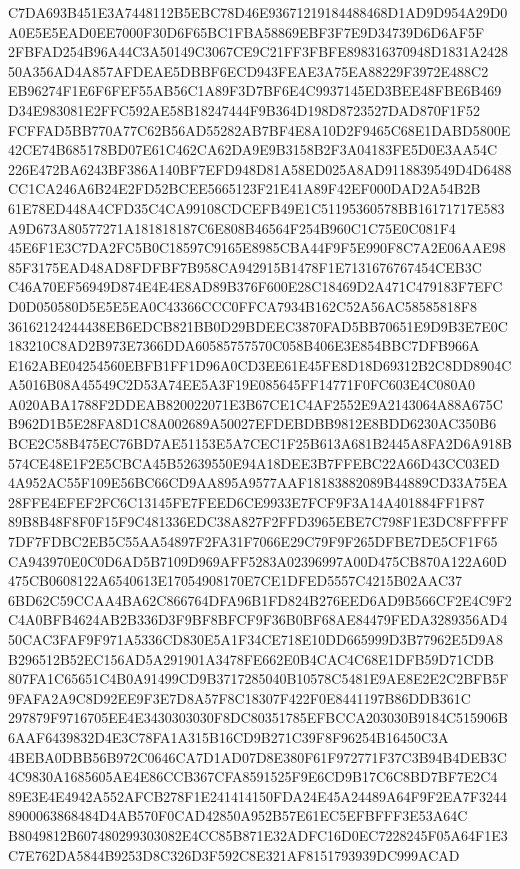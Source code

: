\documentclass[UTF8,fontset=fandol,zihao=-4,a4paper]{ctexart}
\begin{document}
{{C7DA693B451E3A7448112B5EBC78D46E93671219184488468D1AD9D954A29D0A0E5E5EAD0EE7000F30D6F65BC1FBA58869EBF3F7E9D34739D6D6AF5F
2FBFAD254B96A44C3A50149C3067CE9C21FF3FBFE898316370948D1831A242850A356AD4A857AFDEAE5DBBF6ECD943FEAE3A75EA88229F3972E488C2
EB96274F1E6F6FEF55AB56C1A89F3D7BF6E4C9937145ED3BEE48FBE6B469D34E983081E2FFC592AE58B18247444F9B364D198D8723527DAD870F1F52
FCFFAD5BB770A77C62B56AD55282AB7BF4E8A10D2F9465C68E1DABD5800E42CE74B685178BD07E61C462CA62DA9E9B3158B2F3A04183FE5D0E3AA54C
226E472BA6243BF386A140BF7EFD948D81A58ED025A8AD9118839549D4D6488CC1CA246A6B24E2FD52BCEE5665123F21E41A89F42EF000DAD2A54B2B
61E78ED448A4CFD35C4CA99108CDCEFB49E1C51195360578BB16171717E583A9D673A80577271A181818187C6E808B46564F254B960C1C75E0C081F4
45E6F1E3C7DA2FC5B0C18597C9165E8985CBA44F9F5E990F8C7A2E06AAE9885F3175EAD48AD8FDFBF7B958CA942915B1478F1E7131676767454CEB3C
C46A70EF56949D874E4E4E8AD89B376F600E28C18469D2A471C479183F7EFCD0D050580D5E5E5EA0C43366CCC0FFCA7934B162C52A56AC58585818F8
36162124244438EB6EDCB821BB0D29BDEEC3870FAD5BB70651E9D9B3E7E0C183210C8AD2B973E7366DDA60585757570C058B406E3E854BBC7DFB966A
E162ABE04254560EBFB1FF1D96A0CD3EE61E45FE8D18D69312B2C8DD8904CA5016B08A45549C2D53A74EE5A3F19E085645FF14771F0FC603E4C080A0
A020ABA1788F2DDEAB820022071E3B67CE1C4AF2552E9A2143064A88A675CB962D1B5E28FA8D1C8A002689A50027EFDEBDBB9812E8BDD6230AC350B6
BCE2C58B475EC76BD7AE51153E5A7CEC1F25B613A681B2445A8FA2D6A918B574CE48E1F2E5CBCA45B52639550E94A18DEE3B7FFEBC22A66D43CC03ED
4A952AC55F109E56BC66CD9AA895A9577AAF18183882089B44889CD33A75EA28FFE4EFEF2FC6C13145FE7FEED6CE9933E7FCF9F3A14A401884FF1F87
89B8B48F8F0F15F9C481336EDC38A827F2FFD3965EBE7C798F1E3DC8FFFFF7DF7FDBC2EB5C55AA54897F2FA31F7066E29C79F9F265DFBE7DE5CF1F65
CA943970E0C0D6AD5B7109D969AFF5283A02396997A00D475CB870A122A60D475CB0608122A6540613E17054908170E7CE1DFED5557C4215B02AAC37
6BD62C59CCAA4BA62C866764DFA96B1FD824B276EED6AD9B566CF2E4C9F2C4A0BFB4624AB2B336D3F9BF8BFCF9F36B0BF68AE84479FEDA3289356AD4
50CAC3FAF9F971A5336CD830E5A1F34CE718E10DD665999D3B77962E5D9A8B296512B52EC156AD5A291901A3478FE662E0B4CAC4C68E1DFB59D71CDB
807FA1C65651C4B0A91499CD9B3717285040B10578C5481E9AE8E2E2C2BFB5F9FAFA2A9C8D92EE9F3E7D8A57F8C18307F422F0E8441197B86DDB361C
297879F9716705EE4E3430303030F8DC80351785EFBCCA203030B9184C515906B6AAF6439832D4E3C78FA1A315B16CD9B271C39F8F96254B16450C3A
4BEBA0DBB56B972C0646CA7D1AD07D8E380F61F972771F37C3B94B4DEB3C4C9830A1685605AE4E86CCB367CFA8591525F9E6CD9B17C6C8BD7BF7E2C4
89E3E4E4942A552AFCB278F1E241414150FDA24E45A24489A64F9F2EA7F32448900063868484D4AB570F0CAD42850A952B57E61EC5EFBFFF3E53A64C
B8049812B607480299303082E4CC85B871E32ADFC16D0EC7228245F05A64F1E3C7E762DA5844B9253D8C326D3F592C8E321AF8151793939DC999ACAD
}}
\end{document}
